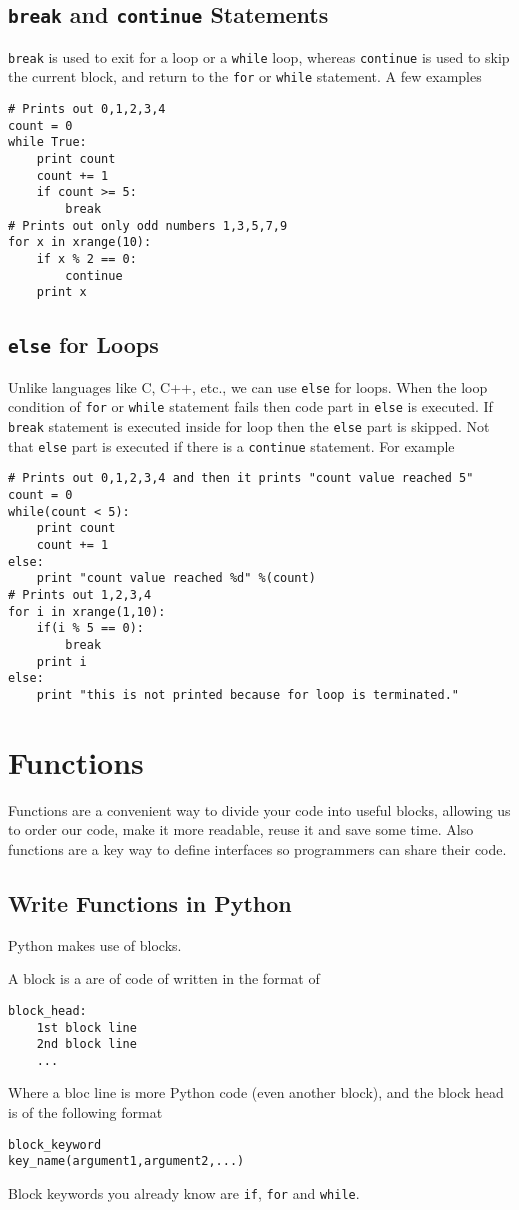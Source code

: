 \documentclass[a4paper,oneside]{book}
\numberwithin{equation}{chapter}
\begin{document}
\subsection{\texttt{break} and \texttt{continue} Statements}
\texttt{break} is used to exit for a loop or a \texttt{while} loop, whereas \texttt{continue} is used to skip the current block, and return to the \texttt{for} or \texttt{while} statement. A few examples
\begin{verbatim}
# Prints out 0,1,2,3,4
count = 0
while True:
    print count
    count += 1
    if count >= 5:
        break
# Prints out only odd numbers 1,3,5,7,9
for x in xrange(10):
    if x % 2 == 0:
        continue
    print x
\end{verbatim}
\subsection{\texttt{else} for Loops}
Unlike languages like C, C++, etc., we can use \texttt{else} for loops. When the loop condition of \texttt{for} or \texttt{while} statement fails then code part in \texttt{else} is executed. If \texttt{break} statement is executed inside for loop then the \texttt{else} part is skipped. Not that \texttt{else} part is executed if there is a \texttt{continue} statement. For example
\begin{verbatim}
# Prints out 0,1,2,3,4 and then it prints "count value reached 5"
count = 0
while(count < 5):
    print count
    count += 1
else:
    print "count value reached %d" %(count)
# Prints out 1,2,3,4
for i in xrange(1,10):
    if(i % 5 == 0):
        break
    print i
else:
    print "this is not printed because for loop is terminated."
\end{verbatim}
\section{Functions}
Functions are a convenient way to divide your code into useful blocks, allowing us to order our code, make it more readable, reuse it and save some time. Also functions are a key way to define interfaces so programmers can share their code.
\subsection{Write Functions in Python}
Python makes use of blocks.

A block is a are of code of written in the format of
\begin{verbatim}
block_head:
    1st block line
    2nd block line
    ...
\end{verbatim}
Where a bloc line is more Python code (even another block), and the block head is of the following format
\begin{verbatim}
block_keyword
key_name(argument1,argument2,...)
\end{verbatim}
Block keywords you already know are \texttt{if}, \texttt{for} and \texttt{while}.
\end{document}
